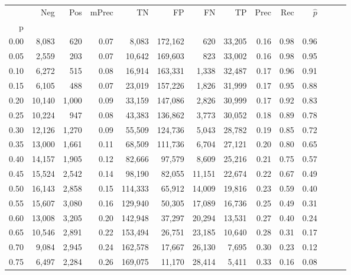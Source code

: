 \begin{tabular}{rrrrrrrrrrrrrr}
\toprule
{} &     Neg &    Pos & mPrec &       TN &       FP &      FN &      TP &  Prec &   Rec & $\hat{p}$ \\
p    &         &        &       &          &          &         &         &       &       &           \\
\midrule
0.00 &   8,083 &    620 &  0.07 &    8,083 &  172,162 &     620 &  33,205 &  0.16 &  0.98 &      0.96 \\
0.05 &   2,559 &    203 &  0.07 &   10,642 &  169,603 &     823 &  33,002 &  0.16 &  0.98 &      0.95 \\
0.10 &   6,272 &    515 &  0.08 &   16,914 &  163,331 &   1,338 &  32,487 &  0.17 &  0.96 &      0.91 \\
0.15 &   6,105 &    488 &  0.07 &   23,019 &  157,226 &   1,826 &  31,999 &  0.17 &  0.95 &      0.88 \\
0.20 &  10,140 &  1,000 &  0.09 &   33,159 &  147,086 &   2,826 &  30,999 &  0.17 &  0.92 &      0.83 \\
0.25 &  10,224 &    947 &  0.08 &   43,383 &  136,862 &   3,773 &  30,052 &  0.18 &  0.89 &      0.78 \\
0.30 &  12,126 &  1,270 &  0.09 &   55,509 &  124,736 &   5,043 &  28,782 &  0.19 &  0.85 &      0.72 \\
0.35 &  13,000 &  1,661 &  0.11 &   68,509 &  111,736 &   6,704 &  27,121 &  0.20 &  0.80 &      0.65 \\
0.40 &  14,157 &  1,905 &  0.12 &   82,666 &   97,579 &   8,609 &  25,216 &  0.21 &  0.75 &      0.57 \\
0.45 &  15,524 &  2,542 &  0.14 &   98,190 &   82,055 &  11,151 &  22,674 &  0.22 &  0.67 &      0.49 \\
0.50 &  16,143 &  2,858 &  0.15 &  114,333 &   65,912 &  14,009 &  19,816 &  0.23 &  0.59 &      0.40 \\
0.55 &  15,607 &  3,080 &  0.16 &  129,940 &   50,305 &  17,089 &  16,736 &  0.25 &  0.49 &      0.31 \\
0.60 &  13,008 &  3,205 &  0.20 &  142,948 &   37,297 &  20,294 &  13,531 &  0.27 &  0.40 &      0.24 \\
0.65 &  10,546 &  2,891 &  0.22 &  153,494 &   26,751 &  23,185 &  10,640 &  0.28 &  0.31 &      0.17 \\
0.70 &   9,084 &  2,945 &  0.24 &  162,578 &   17,667 &  26,130 &   7,695 &  0.30 &  0.23 &      0.12 \\
0.75 &   6,497 &  2,284 &  0.26 &  169,075 &   11,170 &  28,414 &   5,411 &  0.33 &  0.16 &      0.08 \\

\end{tabular}
